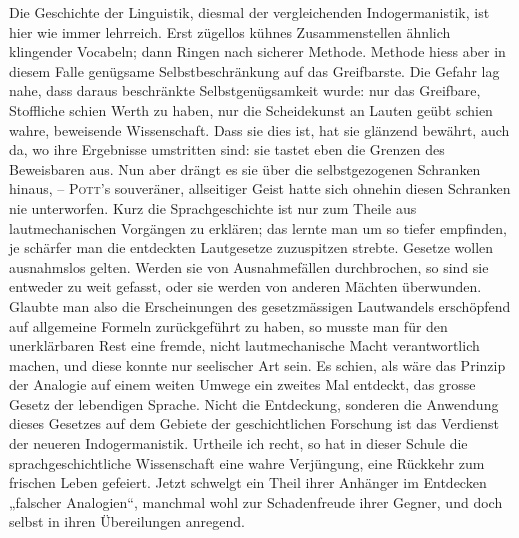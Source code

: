 Die Geschichte der Linguistik, diesmal der vergleichenden Indogermanistik, ist hier wie immer lehrreich. Erst zügellos kühnes Zusammenstellen ähnlich klingender Vocabeln; dann Ringen nach sicherer Methode. Methode hiess aber in diesem Falle genügsame Selbstbeschränkung auf das Greifbarste. Die Gefahr lag nahe, dass daraus beschränkte Selbstgenügsamkeit  wurde: nur das Greifbare, Stoffliche schien Werth zu haben, nur die Scheidekunst an Lauten geübt schien wahre, beweisende Wissenschaft. Dass sie dies ist, hat sie glänzend bewährt, auch da, wo ihre Ergebnisse umstritten sind: sie tastet eben die Grenzen des Beweisbaren aus. Nun aber drängt es sie über die selbstgezogenen Schranken hinaus, – \textsc{Pott}’s souveräner, allseitiger Geist hatte sich ohnehin diesen Schranken nie unterworfen. Kurz die Sprachgeschichte ist nur zum Theile aus lautmechanischen Vorgängen zu erklären; das lernte man um so tiefer empfinden, je schärfer man die entdeckten Lautgesetze zuzuspitzen strebte. Gesetze wollen ausnahmslos gelten. Werden sie von Ausnahmefällen durchbrochen, so sind sie entweder zu weit gefasst, oder sie werden von anderen Mächten überwunden. Glaubte man also die Erscheinungen des gesetzmässigen Lautwandels erschöpfend auf allgemeine Formeln zurückgeführt zu haben, so musste man für den unerklärbaren Rest eine fremde, nicht lautmechanische Macht verantwortlich machen, und diese konnte nur seelischer Art sein. Es schien, als wäre das Prinzip der Analogie auf einem weiten Umwege ein zweites Mal entdeckt, das grosse Gesetz der lebendigen Sprache. Nicht die Entdeckung, sonderen die Anwendung dieses Gesetzes auf dem Gebiete der geschichtlichen Forschung ist das Verdienst der neueren Indogermanistik. Urtheile ich recht, so hat in dieser Schule die sprachgeschichtliche Wissenschaft eine wahre Verjüngung, eine Rückkehr zum frischen Leben gefeiert. Jetzt schwelgt ein Theil ihrer Anhänger im Entdecken „falscher Analogien“, manchmal wohl zur Schadenfreude ihrer Gegner, und doch selbst in ihren Übereilungen anregend.

